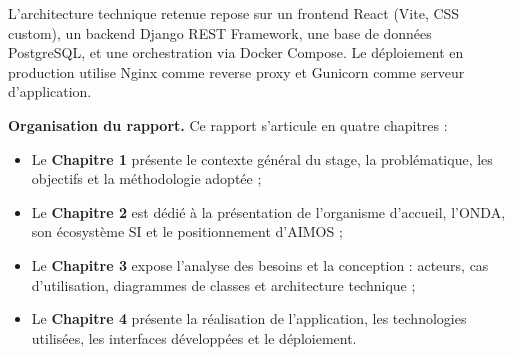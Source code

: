\noindent L'architecture technique retenue repose sur un frontend React (Vite, CSS custom), un backend Django REST Framework, une base de données PostgreSQL, et une orchestration via Docker Compose. Le déploiement en production utilise Nginx comme reverse proxy et Gunicorn comme serveur d'application.

\vspace{0.3cm}
\noindent\textbf{Organisation du rapport.} Ce rapport s'articule en quatre chapitres :
\begin{itemize}
    \item Le \textbf{Chapitre 1} présente le contexte général du stage, la problématique, les objectifs et la méthodologie adoptée ;
    \item Le \textbf{Chapitre 2} est dédié à la présentation de l'organisme d'accueil, l'ONDA, son écosystème SI et le positionnement d'AIMOS ;
    \item Le \textbf{Chapitre 3} expose l'analyse des besoins et la conception : acteurs, cas d'utilisation, diagrammes de classes et architecture technique ;
    \item Le \textbf{Chapitre 4} présente la réalisation de l'application, les technologies utilisées, les interfaces développées et le déploiement.
\end{itemize}
